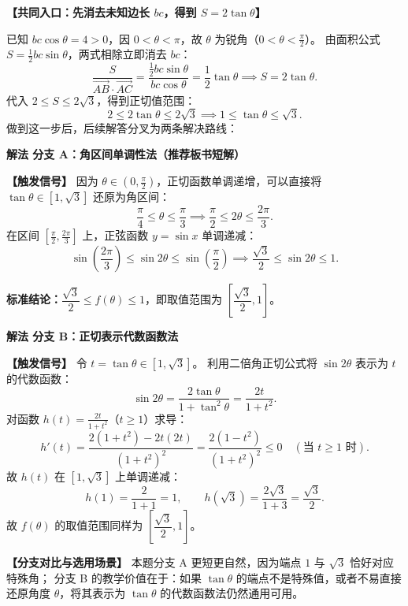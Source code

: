 \documentclass[11pt,a4paper,fontset=fandol]{ctexart}
\newcommand{\vect}[1]{\overrightarrow{#1}}
\newcommand{\ans}[1]{\boxed{#1}}
\newcommand{\method}[1]{\par\medskip\noindent\textbf{解法 #1}\par}
\begin{document}
\noindent\textbf{【共同入口：先消去未知边长 $bc$，得到 $S = 2\tan\theta$】}

已知 $bc\cos\theta = 4 > 0$，因 $0 < \theta < \pi$，故 $\theta$ 为锐角（$0 < \theta < \frac{\pi}{2}$）。
由面积公式 $S = \frac{1}{2}bc\sin\theta$，两式相除立即消去 $bc$：
\[
\frac{S}{\vect{AB}\cdot\vect{AC}} = \frac{\frac{1}{2}bc\sin\theta}{bc\cos\theta} = \frac{1}{2}\tan\theta \implies S = 2\tan\theta.
\]
代入 $2 \le S \le 2\sqrt{3}$，得到正切值范围：
\[
2 \le 2\tan\theta \le 2\sqrt{3} \implies 1 \le \tan\theta \le \sqrt{3}.
\]
做到这一步后，后续解答分叉为两条解决路线：

\medskip
\method{分支 A：角区间单调性法（推荐板书短解）}

\noindent\textbf{【触发信号】}
因为 $\theta \in \left(0, \frac{\pi}{2}\right)$，正切函数单调递增，可以直接将 $\tan\theta \in [1, \sqrt{3}]$ 还原为角区间：
\[
\frac{\pi}{4} \le \theta \le \frac{\pi}{3} \implies \frac{\pi}{2} \le 2\theta \le \frac{2\pi}{3}.
\]
在区间 $\left[\frac{\pi}{2}, \frac{2\pi}{3}\right]$ 上，正弦函数 $y = \sin x$ 单调递减：
\[
\sin\left(\frac{2\pi}{3}\right) \le \sin 2\theta \le \sin\left(\frac{\pi}{2}\right) \implies \frac{\sqrt{3}}{2} \le \sin 2\theta \le 1.
\]

\begin{answerbox}
\textbf{标准结论：}\(\ans{\dfrac{\sqrt{3}}{2} \le f(\theta) \le 1}\)，即取值范围为 \(\left[\dfrac{\sqrt{3}}{2}, 1\right]\)。
\end{answerbox}

\method{分支 B：正切表示代数函数法}

\noindent\textbf{【触发信号】}
令 $t = \tan\theta \in [1, \sqrt{3}]$。
利用二倍角正切公式将 $\sin 2\theta$ 表示为 $t$ 的代数函数：
\[
\sin 2\theta = \frac{2\tan\theta}{1 + \tan^2\theta} = \frac{2t}{1 + t^2}.
\]
对函数 $h(t) = \frac{2t}{1 + t^2}$（$t \ge 1$）求导：
\[
h'(t) = \frac{2(1 + t^2) - 2t(2t)}{(1 + t^2)^2} = \frac{2(1 - t^2)}{(1 + t^2)^2} \le 0 \quad (\text{当 } t \ge 1 \text{ 时}).
\]
故 $h(t)$ 在 $[1, \sqrt{3}]$ 上单调递减：
\[
h(1) = \frac{2}{1 + 1} = 1, \qquad h(\sqrt{3}) = \frac{2\sqrt{3}}{1 + 3} = \frac{\sqrt{3}}{2}.
\]
故 $f(\theta)$ 的取值范围同样为 $\left[\dfrac{\sqrt{3}}{2}, 1\right]$。

\begin{note}
\textbf{【分支对比与选用场景】} 
本题分支 A 更短更自然，因为端点 $1$ 与 $\sqrt{3}$ 恰好对应特殊角；
分支 B 的教学价值在于：如果 $\tan\theta$ 的端点不是特殊值，或者不易直接还原角度 $\theta$，将其表示为 $\tan\theta$ 的代数函数法仍然通用可用。
\end{note}
\end{document}
